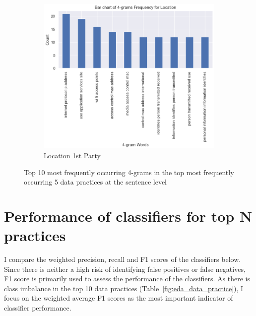 \begin{figure}[!ht]
	\begin{subfigure}[t]{.5\textwidth}
		\centering
		\includegraphics[width=\linewidth]{figures/4_grams_location.png}
		\caption{Location 1st Party}
	\end{subfigure}
	\caption{Top 10 most frequently occurring 4-grams in the top most frequently occurring 5 data practices at the sentence level}
	\label{fig:4_grams_sentence}
  \end{figure}

\section{Performance of classifiers for top N practices}
I compare the weighted precision, recall and F1 scores of the classifiers below. Since there is neither a high risk of identifying false positives or false negatives, F1 score is primarily used to assess the performance of the classifiers. As there is class imbalance in the top 10 data practices (Table~\ref{fig:eda_data_practice}), I focus on the weighted average F1 scores as the most important indicator of classifier performance. 

